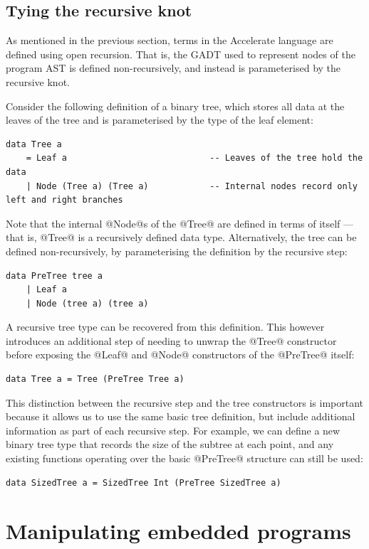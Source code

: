 \subsection{Tying the recursive knot}
\label{sec:knot_tying}

As mentioned in the previous section, terms in the Accelerate language are
defined using open recursion. That is, the GADT used to represent nodes of the
program AST is defined non-recursively, and instead is parameterised by the
recursive knot.

Consider the following definition of a binary tree, which stores all data at the
leaves of the tree and is parameterised by the type of the leaf element:
%
\begin{lstlisting}[style=haskell]
data Tree a
    = Leaf a                            -- Leaves of the tree hold the data
    | Node (Tree a) (Tree a)            -- Internal nodes record only left and right branches
\end{lstlisting}
%
Note that the internal @Node@s of the @Tree@ are defined in terms of
itself --- that is, @Tree@ is a recursively defined data type.
Alternatively, the tree can be defined non-recursively, by parameterising the
definition by the recursive step:
%
\begin{lstlisting}[style=haskell]
data PreTree tree a
    | Leaf a
    | Node (tree a) (tree a)
\end{lstlisting}
%
A recursive tree type can be recovered from this definition. This however
introduces an additional step of needing to unwrap the @Tree@ constructor before
exposing the @Leaf@ and @Node@ constructors of the @PreTree@ itself:
%
\begin{lstlisting}[style=haskell,firstnumber=4]
data Tree a = Tree (PreTree Tree a)
\end{lstlisting}

This distinction between the recursive step and the tree constructors is
important because it allows us to use the same basic tree definition, but
include additional information as part of each recursive step. For example, we
can define a new binary tree type that records the size of the subtree at each
point, and any existing functions operating over the basic @PreTree@ structure
can still be used:
%
\begin{lstlisting}[style=haskell,firstnumber=5]
data SizedTree a = SizedTree Int (PreTree SizedTree a)
\end{lstlisting}


\section{Manipulating embedded programs}
\label{sec:manipulating_embedded_programs}

